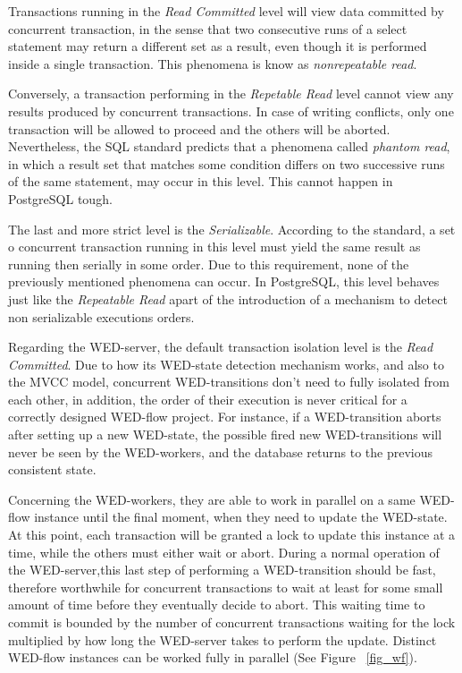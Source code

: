 \documentclass[conference]{IEEEtran}
\begin{document}
\par Transactions running in the \emph{Read Committed} level will view data committed by concurrent transaction, in the sense that
two consecutive runs of a select statement may return a different set as a result, even though it is performed inside a 
single transaction. This phenomena is know as \emph{nonrepeatable read}.

\par Conversely, a transaction performing in the \emph{Repetable Read} level cannot view any results produced by concurrent
transactions. In case of writing conflicts, only one transaction will be allowed to proceed and the others will be aborted.
Nevertheless, the SQL standard predicts that a phenomena called \emph{phantom read}, in which a result set that matches some
condition differs on two successive runs of the same statement, may occur in this level. This cannot happen in PostgreSQL tough.

\par The last and more strict level is the \emph{Serializable}. According to the standard, a set o concurrent transaction
running in this level must yield the same result as running then serially in some order. Due to this requirement, none of 
the previously mentioned phenomena can occur. In PostgreSQL, this level behaves just like the \emph{Repeatable Read} apart
of the introduction of a mechanism to detect non serializable executions orders. 
 
\par Regarding the WED-server, the default transaction isolation level is the \emph{Read Committed}. Due to how its
WED-state detection mechanism works, and also to the MVCC model, concurrent WED-transitions don't need to fully isolated 
from each other, in addition, the order of their execution is never critical for a correctly designed WED-flow project. 
For instance, if a WED-transition aborts after setting up a new WED-state, the possible fired new WED-transitions
will never be seen by the WED-workers, and the database returns to the previous consistent state.  

\par Concerning the WED-workers, they are able to work in parallel on a same WED-flow instance until the final moment, when
they need to update the WED-state. At this point, each transaction will be granted a lock to update this instance at a time,
while the others must either wait or abort. During a normal operation of the WED-server,this last step of performing a WED-transition
should be fast, therefore worthwhile for concurrent transactions to wait at least for some small amount of time before they
eventually decide to abort. This waiting time to commit is bounded by the number of concurrent transactions waiting for 
the lock multiplied by how long the WED-server takes to perform the update. Distinct WED-flow instances can be worked fully
in parallel (See Figure ~\ref{fig_wf}).
   
\end{document}
